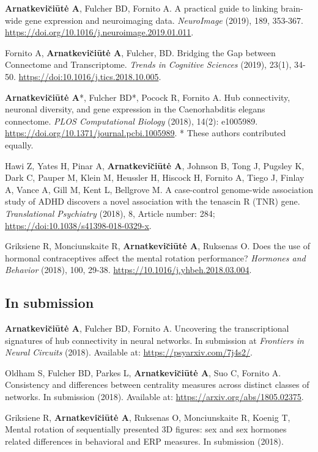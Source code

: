 \vspace*{20mm}
\vspace{10mm}

\textbf{Arnatkevi\u{c}i\={u}t\.{e} A}, Fulcher BD, Fornito A. A practical guide to linking brain-wide gene expression and neuroimaging data. \textit{NeuroImage} (2019), 189, 353-367. \url{https://doi.org/10.1016/j.neuroimage.2019.01.011}.

Fornito A, \textbf{Arnatkevi\u{c}i\={u}t\.{e} A}, Fulcher, BD. Bridging the Gap between Connectome and Transcriptome. \textit{Trends in Cognitive Sciences} (2019), 23(1), 34-50. \url{https://doi:10.1016/j.tics.2018.10.005}.

\textbf{Arnatkevi\u{c}i\={u}t\.{e} A}*, Fulcher BD*, Pocock R, Fornito A. Hub connectivity, neuronal diversity, and gene expression in the Caenorhabditis elegans connectome. \textit{PLOS Computational Biology} (2018), 14(2): e1005989. \url{https://doi.org/10.1371/journal.pcbi.1005989}. * These authors contributed equally.

Hawi Z, Yates H, Pinar A, \textbf{Arnatkevi\u{c}i\={u}t\.{e} A}, Johnson B, Tong J, Pugsley K, Dark C, Pauper M, Klein M, Heussler H, Hiscock H, Fornito A, Tiego J, Finlay A, Vance A, Gill M, Kent L, Bellgrove M. A case-control genome-wide association study of ADHD discovers a novel association with the tenascin R (TNR) gene. \textit{Translational Psychiatry} (2018), 8, Article number: 284; \url{https://doi:10.1038/s41398-018-0329-x}.

Griksiene R, Monciunskaite R, \textbf{Arnatkevi\u{c}i\={u}t\.{e} A}, Ruksenas O. Does the use of hormonal contraceptives affect the mental rotation performance? \textit{Hormones and Behavior} (2018), 100, 29-38. \url{https://10.1016/j.yhbeh.2018.03.004}.

\subsection*{In submission}

\textbf{Arnatkevi\u{c}i\={u}t\.{e} A}, Fulcher BD, Fornito A. Uncovering the transcriptional signatures of hub connectivity in neural networks. In submission at \textit{Frontiers in Neural Circuits} (2018). Available at: \url{https://psyarxiv.com/7j4s2/}.
 
Oldham S, Fulcher BD, Parkes L, \textbf{Arnatkevi\u{c}i\={u}t\.{e} A}, Suo C, Fornito A. Consistency and differences between centrality measures across distinct classes of networks. In submission (2018). Available at: \url{https://arxiv.org/abs/1805.02375}.

Griksiene R, \textbf{Arnatkevi\u{c}i\={u}t\.{e} A}, Ruksenas O, Monciunskaite R, Koenig T, Mental rotation of sequentially presented 3D figures: sex and sex hormones related differences in behavioral and ERP measures. In submission (2018). 

\vspace{3mm}

